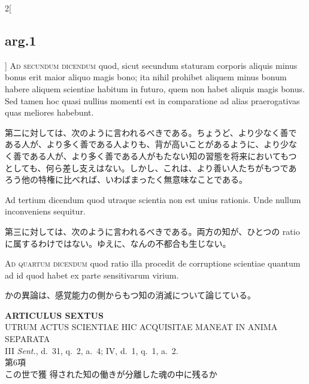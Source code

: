 \documentclass[paper=a4paper,fontsize=10pt,jafontsize=9pt,titlepage]{jlreq}
\begin{document}
\begin{paracol}{2}[\subsection{arg.1}]
{\scshape Ad secundum dicendum} quod, sicut secundum staturam
corporis aliquis minus bonus erit maior aliquo magis bono; ita nihil
prohibet aliquem minus bonum habere aliquem scientiae habitum in
futuro, quem non habet aliquis magis bonus. Sed tamen hoc quasi
nullius momenti est in comparatione ad alias praerogativas quas
meliores habebunt.

\switchcolumn

第二に対しては、次のように言われるべきである。ちょうど、より少なく善で
ある人が、より多く善である人よりも、背が高いことがあるように、より少な
く善である人が、より多く善である人がもたない知の習態を将来においてもつ
としても、何ら差し支えはない。しかし、これは、より善い人たちがもつであ
ろう他の特権に比べれば、いわばまったく無意味なことである。

\switchcolumn*

Ad tertium dicendum quod utraque scientia non est unius rationis. Unde
nullum inconveniens sequitur.

\switchcolumn

第三に対しては、次のように言われるべきである。両方の知が、ひとつの
ratioに属するわけではない。ゆえに、なんの不都合も生じない。

\switchcolumn*[\subsection{ad.4}]

{\scshape Ad quartum dicendum} quod ratio illa procedit de corruptione
scientiae quantum ad id quod habet ex parte sensitivarum virium.

\switchcolumn

かの異論は、感覚能力の側からもつ知の消滅について論じている。

\end{paracol}


\newpage
{}

{}
\setcounter{section}{6}
\setcounter{subsection}{0}
\begin{center}
{\Large {\bfseries ARTICULUS SEXTUS}}\\ {\large UTRUM ACTUS SCIENTIAE HIC
ACQUISITAE MANEAT IN ANIMA SEPARATA}\\ {\footnotesize III {\itshape Sent.},
d.~31, q.~2, a.~4; IV, d.~1, q.~1, a.~2.}\\ {\Large 第6項\\この世で獲
得された知の働きが分離した魂の中に残るか}
\end{center}
\end{document}
